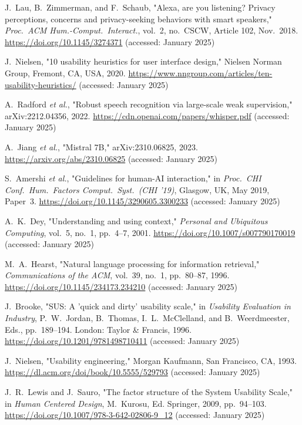 \documentclass[a4paper,12pt]{article}
\begin{document}
\begin{thebibliography}{30}
 J.~Lau, B.~Zimmerman, and F.~Schaub, "Alexa, are you listening? Privacy perceptions, concerns and privacy-seeking behaviors with smart speakers," \textit{Proc.~ACM Hum.-Comput.~Interact.}, vol.~2, no.~CSCW, Article 102, Nov.~2018. \url{https://doi.org/10.1145/3274371} (accessed: January 2025)

 J.~Nielsen, "10 usability heuristics for user interface design," Nielsen Norman Group, Fremont, CA, USA, 2020. \url{https://www.nngroup.com/articles/ten-usability-heuristics/} (accessed: January 2025)

 A.~Radford \textit{et al.}, "Robust speech recognition via large-scale weak supervision," arXiv:2212.04356, 2022. \url{https://cdn.openai.com/papers/whisper.pdf} (accessed: January 2025)

 A.~Jiang \textit{et al.}, "Mistral 7B," arXiv:2310.06825, 2023. \url{https://arxiv.org/abs/2310.06825} (accessed: January 2025)

 S.~Amershi \textit{et al.}, "Guidelines for human-AI interaction," in \textit{Proc.~CHI Conf.~Hum.~Factors Comput.~Syst.~(CHI '19)}, Glasgow, UK, May 2019, Paper~3. \url{https://doi.org/10.1145/3290605.3300233} (accessed: January 2025)

 A.~K.~Dey, "Understanding and using context," \textit{Personal and Ubiquitous Computing}, vol.~5, no.~1, pp.~4--7, 2001. \url{https://doi.org/10.1007/s007790170019} (accessed: January 2025)

 M.~A.~Hearst, "Natural language processing for information retrieval," \textit{Communications of the ACM}, vol.~39, no.~1, pp.~80--87, 1996. \url{https://doi.org/10.1145/234173.234210} (accessed: January 2025)

 J.~Brooke, "SUS: A 'quick and dirty' usability scale," in \textit{Usability Evaluation in Industry}, P.~W.~Jordan, B.~Thomas, I.~L.~McClelland, and B.~Weerdmeester, Eds., pp.~189--194. London: Taylor \& Francis, 1996. \url{https://doi.org/10.1201/9781498710411} (accessed: January 2025)

 J.~Nielsen, "Usability engineering," Morgan Kaufmann, San Francisco, CA, 1993. \url{https://dl.acm.org/doi/book/10.5555/529793} (accessed: January 2025)

 J.~R.~Lewis and J.~Sauro, "The factor structure of the System Usability Scale," in \textit{Human Centered Design}, M.~Kurosu, Ed. Springer, 2009, pp.~94--103. \url{https://doi.org/10.1007/978-3-642-02806-9_12} (accessed: January 2025)


\end{thebibliography}
\end{document}
